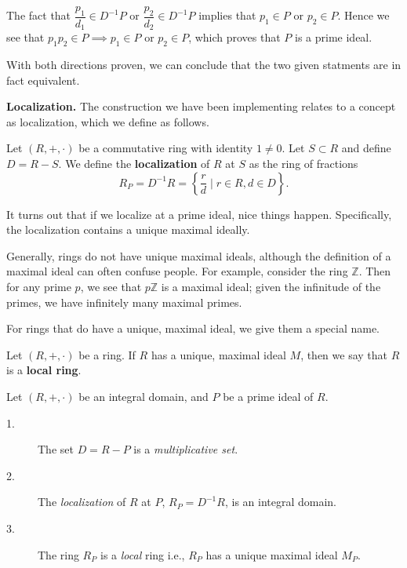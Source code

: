 \begin{prf}
\begin{description}
        The fact that $\dfrac{p_1}{d_1} \in D^{-1}P$ or
        $\dfrac{p_2}{d_2} \in D^{-1}P$ implies that $p_1 \in P$ or
        $p_2 \in P$. Hence we see that $p_1p_2 \in P \implies p_1 \in
        P$ or $p_2 \in P$, which proves that $P$ is a prime ideal.
    \end{description}
    With both directions proven, we can conclude that the two given
    statments are in fact equivalent.
\end{prf}

\textbf{Localization.}
The construction we have been implementing relates to a concept
as localization, which we define as follows. 
\begin{definition}
    Let $(R, +, \cdot)$ be a commutative ring with identity $1 \ne
    0$. Let $S \subset R$ and define $D = R - S$. We define the
    \textbf{localization} of 
    $R$ at $S$ as the ring of fractions 
    \[
        R_P = D^{-1}R = \left\{ \frac{r}{d} \mid r \in R, d \in D \right\}.
    \]
\end{definition}
It turns out that if we localize at a prime ideal, nice things
happen. Specifically, the localization contains a unique maximal
ideally. 

Generally, rings do not have unique maximal ideals, although the
definition of a maximal ideal can often confuse people. For
example, consider the ring $\mathbb{Z}$. Then for any prime $p$,
we see that $p\mathbb{Z}$ is a maximal ideal; given the infinitude
of the primes, we have infinitely many maximal primes. 

For rings that do have a unique, maximal ideal, we give them a
special name. 

\begin{definition}
    Let $(R, +, \cdot)$ be a ring. If $R$ has a unique, maximal
    ideal $M$, then we say that $R$ is a \textbf{local ring}.
\end{definition}

\begin{thm}
    Let $(R, +, \cdot)$ be an integral domain, and $P$ be a prime
    ideal of $R$. 
    \begin{description}
        \item[1.] The set $D = R - P$ is a \textit{multiplicative set}.

        \item[2.] The \textit{localization} of $R$ at $P$, $R_P =
        D^{-1}R$, is an integral domain. 

        \item[3.] The ring $R_P$ is a \textit{local} ring i.e., $R_P$ has
        a unique maximal ideal $M_P$.
    \end{description}
\end{thm}

